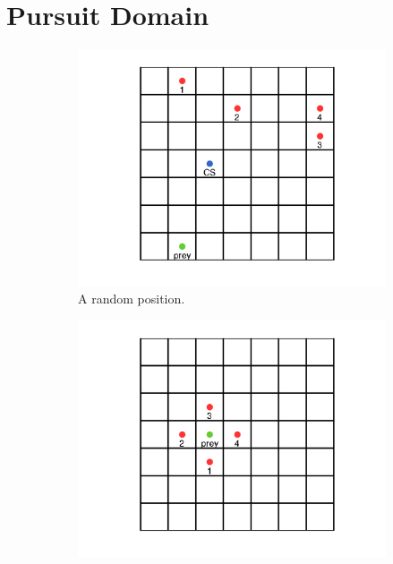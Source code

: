 \section{Pursuit Domain}
\label{sec:domain}

\begin{figure}[t]
\centering
\begin{subfigure}[t]{0.19\textwidth}
\centering
\captionsetup{width=0.9\textwidth}
\includegraphics[trim=7cm 3cm 6cm 2cm, clip=true, width=\gridwidth\textwidth]{plots/visuals/teamConfigRandom.png}
\caption{A random position.}
\label{fig:randpos}
\end{subfigure}
\begin{subfigure}[t]{0.19\textwidth}
\centering
\captionsetup{width=0.9\textwidth}
\includegraphics[trim=7cm 3cm 6cm 2cm, clip=true, width=\gridwidth\textwidth]{plots/visuals/teamConfigCapture.png}

\end{subfigure}
\end{figure}
